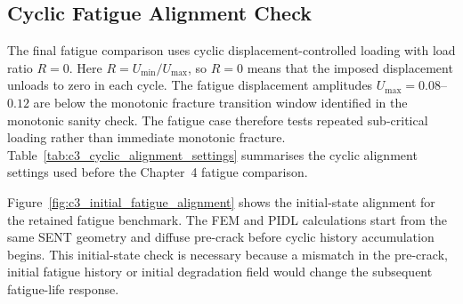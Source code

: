 \subsection{Cyclic Fatigue Alignment Check}
\label{subsec:c3_aligned_settings}


The final fatigue comparison uses cyclic displacement-controlled loading with load ratio $R=0$. Here \(R=U_{\min}/U_{\max}\), so \(R=0\) means that the imposed displacement unloads to zero in each cycle. The fatigue displacement amplitudes \(U_{\max}=0.08\)--\(0.12\) are below the monotonic fracture transition window identified in the monotonic sanity check. The fatigue case therefore tests repeated sub-critical loading rather than immediate monotonic fracture. Table~\ref{tab:c3_cyclic_alignment_settings} summarises the cyclic alignment settings used before the Chapter~4 fatigue comparison.

Figure~\ref{fig:c3_initial_fatigue_alignment} shows the initial-state alignment for the retained fatigue benchmark. The FEM and PIDL calculations start from the same SENT geometry and diffuse pre-crack before cyclic history accumulation begins. This initial-state check is necessary because a mismatch in the pre-crack, initial fatigue history or initial degradation field would change the subsequent fatigue-life response.


